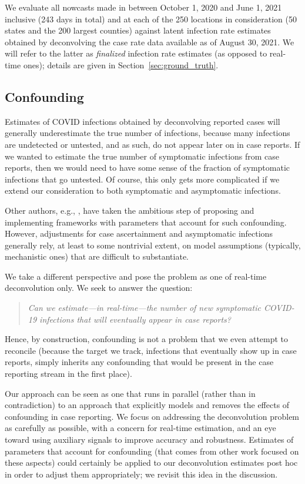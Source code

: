 \documentclass[sts]{imsart}
\theoremstyle{plain}
\theoremstyle{definition}
\theoremstyle{remark}
\begin{document}
We evaluate all nowcasts made in between October 1, 2020 and June 1, 2021
inclusive (243 days in total) and at each of the 250 locations in consideration 
(50 states and the 200 largest counties) against latent infection rate estimates 
obtained by deconvolving the case rate data available as of August 30, 2021. 
We will refer to the latter as \emph{finalized} infection rate estimates (as 
opposed to real-time ones); details are given in Section~\ref{sec:ground_truth}. 

\subsection{Confounding}
\label{sec:confounding}

Estimates of COVID infections obtained by deconvolving reported cases will
generally underestimate the true number of infections, because many infections
are undetected or untested, and as such, do not appear later on in case
reports. If we wanted to estimate the true number of symptomatic infections
from case reports, then we would need to have some sense of the fraction of 
symptomatic infections that go untested. Of course, this only gets more
complicated if we extend our consideration to both symptomatic and asymptomatic
infections.  

Other authors, e.g., \citet{Chitwood:2021}, have taken the ambitious step of
proposing and implementing frameworks with parameters that account for such
confounding. However, adjustments for case ascertainment and asymptomatic
infections generally rely, at least to some nontrivial extent, on model
assumptions (typically, mechanistic ones) that are difficult to substantiate.

We take a different perspective and pose the problem as one of real-time 
deconvolution only. We seek to answer the question:   
\begin{quote}
\it
Can we estimate---in real-time---the number of new symptomatic COVID-19
infections that will eventually appear in case reports?  
\end{quote}
Hence, by construction, confounding is not a problem that we even attempt   
to reconcile (because the target we track, infections that eventually show up
in case reports, simply inherits any confounding that would be present in the
case reporting stream in the first place). 

Our approach can be seen as one that runs in parallel (rather than in
contradiction) to an approach that explicitly models and removes the effects of
confounding in case reporting. We focus on addressing the deconvolution problem
as carefully as possible, with a concern for real-time estimation, and an eye
toward using auxiliary signals to improve accuracy and robustness. Estimates of
parameters that account for confounding (that comes from other work focused on  
these aspects) could certainly be applied to our deconvolution estimates post
hoc in order to adjust them appropriately; we revisit this idea in the
discussion. 
\end{document}
